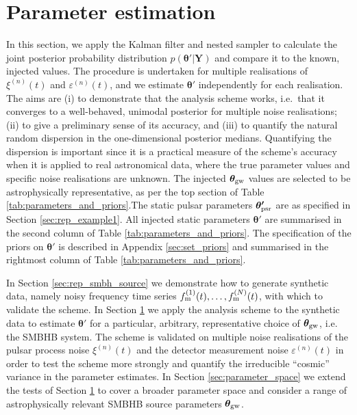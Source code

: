\documentclass[fleqn,usenatbib,useAMS]{mnras}
\begin{document}
 
\section{Parameter estimation} \label{sec:pe_and_ms} 
In this section, we apply the Kalman filter and nested sampler to calculate the joint posterior probability distribution $p({\boldsymbol{\theta'}} | {\boldsymbol{Y}})$ and compare it to the known, injected values. The procedure is undertaken for multiple realisations of $\xi^{(n)}(t)$ and $\varepsilon^{(n)}(t)$, and we estimate $\boldsymbol{\theta'}$ independently for each realisation. The aims are (i) to demonstrate that the analysis scheme works, i.e.\ that it converges to a well-behaved, unimodal posterior for multiple noise realisations; (ii) to give a preliminary sense of its accuracy, and (iii) to quantify the natural random dispersion in the one-dimensional posterior medians. Quantifying the dispersion is important since it is a practical measure of the scheme's accuracy when it is applied to real astronomical data, where the true parameter values and specific noise realisations are unknown. The injected $\boldsymbol{\theta}_{\rm gw}$ values are selected to be astrophysically representative, as per the top section of Table \ref{tab:parameters_and_priors}.The static pulsar parameters $\boldsymbol{\theta'}_{\rm psr}$  are as specified in Section \ref{sec:rep_example1}. All injected static parameters $\boldsymbol{\theta}'$ are summarised in the second column of Table \ref{tab:parameters_and_priors}. The specification of the priors on $\boldsymbol{\theta'}$ is described in Appendix \ref{sec:set_priors} and summarised in the rightmost column of Table \ref{tab:parameters_and_priors}. 






In Section \ref{sec:rep_smbh_source} we demonstrate how to generate synthetic data, namely noisy frequency time series $f_{\rm m}^{(1)}(t), \dots, f_{\rm m}^{(N)}(t)$, with which to validate the scheme. In Section \ref{sec:pe_and_ms} we apply the analysis scheme to the synthetic data to estimate $\boldsymbol{\theta'}$ for a  particular, arbitrary, representative choice of $\boldsymbol{\theta}_{\rm gw}$, i.e. the SMBHB system. The scheme is validated on multiple noise realisations of the pulsar process noise $\xi^{(n)}(t)$ and the detector measurement noise $\varepsilon^{(n)}(t)$ in order to test the scheme more strongly and quantify the  irreducible ``cosmic'' variance in the parameter estimates. In Section \ref{sec:parameter_space} we extend the tests of Section  \ref{sec:pe_and_ms}
to cover a broader parameter space and consider a range of astrophysically relevant SMBHB source parameters $\boldsymbol{\theta}_{\rm gw}$. 
\end{document}
